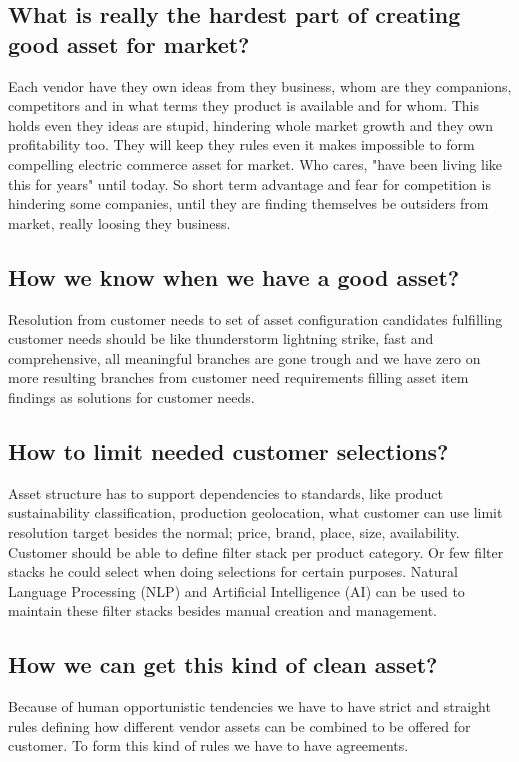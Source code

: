 \subsection{What is really the hardest part of creating good asset for market?}
\label{selfishness_obstacle}
Each vendor have they own ideas from they business, whom are they companions, competitors and in what terms they product is available and for whom. This holds even they ideas are stupid, hindering whole market growth and they own profitability too. They will keep they rules even it makes impossible to form compelling electric commerce asset for market. Who cares, "have been living like this for years" until today. So short term advantage and fear for competition is hindering some companies, until they are finding themselves be outsiders from market, really loosing they business.

\subsection{How we know when we have a good asset?}
\label{asset_goodness}
Resolution from customer needs to set of asset configuration candidates fulfilling customer needs should be like thunderstorm lightning strike, fast and comprehensive, all meaningful branches are gone trough and we have zero on more resulting branches from customer need requirements filling asset item findings as solutions for customer needs.

\subsection{How to limit needed customer selections?}
\label{asset_search}
Asset structure has to support dependencies to standards, like product sustainability classification, production geolocation, what customer can use limit resolution target besides the normal; price, brand, place, size, availability. Customer should be able to define filter stack per product category. Or few filter stacks he could select when doing selections for certain purposes. Natural Language Processing (NLP) and Artificial Intelligence (AI) can be used to maintain these filter stacks besides manual creation and management.

\subsection{How we can get this kind of clean asset?}
\label{asset_cleaness}
Because of human opportunistic tendencies\cite{SevenSins} we have to have strict and straight rules defining how different vendor assets can be combined to be offered for customer. To form this kind of rules we have to have agreements.

